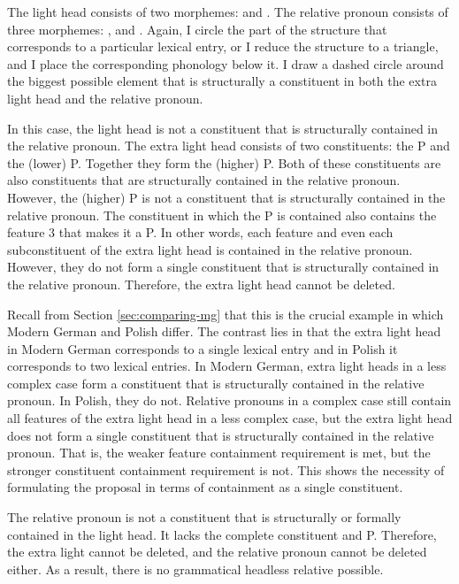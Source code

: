 The light head consists of two morphemes:  and .
The relative pronoun consists of three morphemes: ,  and .
Again, I circle the part of the structure that corresponds to a particular lexical entry, or I reduce the structure to a triangle, and I place the corresponding phonology below it.
I draw a dashed circle around the biggest possible element that is structurally a constituent in both the extra light head and the relative pronoun.

In this case, the light head is not a constituent that is structurally contained in the relative pronoun.
The extra light head consists of two constituents: the P and the (lower) P. Together they form the (higher) P.
Both of these constituents are also constituents that are structurally contained in the relative pronoun. However, the (higher) P is not a constituent that is structurally contained in the relative pronoun. The constituent in which the P is contained also contains the feature 3 that makes it a P.
In other words, each feature and even each subconstituent of the extra light head is contained in the relative pronoun. However, they do not form a single constituent that is structurally contained in the relative pronoun. Therefore, the extra light head cannot be deleted.

Recall from Section \ref{sec:comparing-mg} that this is the crucial example in which Modern German and Polish differ. The contrast lies in that the extra light head in Modern German corresponds to a single lexical entry and in Polish it corresponds to two lexical entries.
In Modern German, extra light heads in a less complex case form a constituent that is structurally contained in the relative pronoun.
In Polish, they do not.
Relative pronouns in a complex case still contain all features of the extra light head in a less complex case, but the extra light head does not form a single constituent that is structurally contained in the relative pronoun. That is, the weaker feature containment requirement is met, but the stronger constituent containment requirement is not. This shows the necessity of formulating the proposal in terms of containment as a single constituent.

The relative pronoun is not a constituent that is structurally or formally contained in the light head. It lacks the complete constituent and P.
Therefore, the extra light cannot be deleted, and the relative pronoun cannot be deleted either.
As a result, there is no grammatical headless relative possible.


